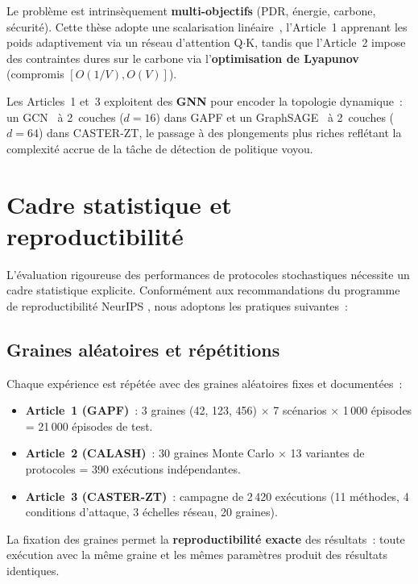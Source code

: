 Le problème est intrinsèquement \textbf{multi-objectifs} (PDR, énergie, carbone, sécurité). Cette thèse adopte une scalarisation linéaire~\cite{Hayes2022MOMARL}, l'Article~1 apprenant les poids adaptivement via un réseau d'attention Q$\cdot$K, tandis que l'Article~2 impose des contraintes dures sur le carbone via l'\textbf{optimisation de Lyapunov}~\cite{neely2010lyapunov} (compromis $[O(1/V), O(V)]$).

Les Articles~1 et~3 exploitent des \textbf{GNN} pour encoder la topologie dynamique~: un GCN~\cite{kipf2017semi} à 2~couches ($d = 16$) dans GAPF et un GraphSAGE~\cite{hamilton2017graphsage} à 2~couches ($d = 64$) dans CASTER-ZT, le passage à des plongements plus riches reflétant la complexité accrue de la tâche de détection de politique voyou.


\section{Cadre statistique et reproductibilité}\label{sec:demarche-stats}

L'évaluation rigoureuse des performances de protocoles stochastiques nécessite un cadre statistique explicite. Conformément aux recommandations du programme de reproductibilité NeurIPS \cite{Pineau2021Reproducibility}, nous adoptons les pratiques suivantes~:

\subsection{Graines aléatoires et répétitions}

Chaque expérience est répétée avec des graines aléatoires fixes et documentées~:
\begin{itemize}
    \item \textbf{Article~1 (GAPF)}~: 3 graines (42, 123, 456) $\times$ 7 scénarios $\times$ 1\,000 épisodes = 21\,000 épisodes de test.
    \item \textbf{Article~2 (CALASH)}~: 30 graines Monte Carlo $\times$ 13 variantes de protocoles = 390 exécutions indépendantes.
    \item \textbf{Article~3 (CASTER-ZT)}~: campagne de 2\,420 exécutions (11 méthodes, 4 conditions d'attaque, 3 échelles réseau, 20 graines).
\end{itemize}
La fixation des graines permet la \textbf{reproductibilité exacte} des résultats~: toute exécution avec la même graine et les mêmes paramètres produit des résultats identiques.

